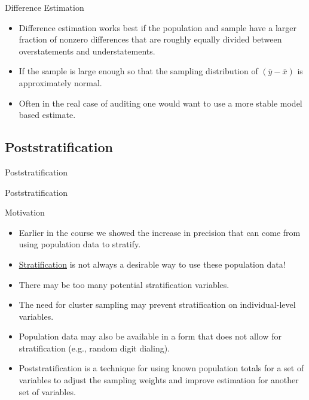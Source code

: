 \documentclass[10pt]{beamer}\usepackage[]{graphicx}\usepackage[]{xcolor}
\begin{document}
\begin{frame}{Difference Estimation}
\begin{block}{}
\begin{itemize}
\item Difference estimation works best if the population and sample have a larger fraction of nonzero differences that are roughly equally divided between overstatements and understatements.
\item If the sample is large enough so that the sampling distribution of $(\bar{y}-\bar{x})$ is approximately normal.
\item Often in the real case of auditing one would want to use a more stable model based estimate.
\end{itemize}
\end{block}
\end{frame}

\subsection{Poststratification}
\begin{frame}{}
\begin{block}{}
\begin{center}
Poststratification
\end{center}
\end{block}
\end{frame}

\begin{frame}{Poststratification}
\begin{block}{Motivation}
\begin{itemize}
\item Earlier in the course we showed the increase in precision that can come from using population data to stratify.
\item \underline{Stratification} is not always a desirable way to use these population data!
\item There may be too many potential stratification variables.
\item The need for cluster sampling may prevent stratification on individual-level variables.
\item Population data may also be available in a form that does not allow for stratification (e.g., random digit dialing).
\item Poststratification is a technique for using known population totals for a set of variables to adjust the sampling weights and improve estimation for another set of variables.
\end{itemize}
\end{block}
\end{frame}
\end{document}
